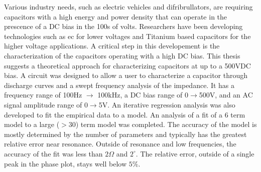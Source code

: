 \label{sec:abstract}
Various industry needs, such as electric vehicles and difribrullators, are requiring capacitors with a high energy and power density that can operate in the prescence of a DC bias in the 100s of volts. Researchers have been developing technologies such as \gls{ec} for lower voltages and Titanium based capacitors for the higher voltage applications. A critical step in this developement is the characterization of the capacitors operating with a high DC bias.
This thesis suggests a theoretical approach for characterizing capacitors at up to a 500VDC bias. A circuit was designed to allow a user to characterize a capacitor through discharge curves and a swept frequency analysis of the impedance. It has a frequency range of 100Hz $\rightarrow$ 100kHz, a DC bias range of 0$\rightarrow$500V, and an AC signal amplitude range of 0$\rightarrow$5V.
An iterative regression analysis was also developed to fit the empirical data to a model. An analysis of a fit of a 6 term model to a large ($>30$) term model was completed. The accuracy of the model is mostly determined by the number of parameters and typically has the greatest relative error near resonance. Outside of resonance and low frequencies, the accuracy of the fit was less than $2 \Omega$ and $2^{\circ}$. The relative error, outside of a single peak in the phase plot, stays well below $5\%$.

